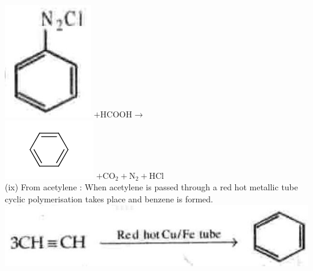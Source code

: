 \documentclass[10pt]{article}
\begin{document}
\includegraphics[max width=\textwidth]{2025_01_28_8470952b98110cec3aabg-205(8)} $+\mathrm{HCOOH} \longrightarrow$\\
\includegraphics{smile-e64fcb047c08d2e0a47b7ef6554e727ec34e89e4} $+\mathrm{CO}_{2}+\mathrm{N}_{2}+\mathrm{HCl}$\\
(ix) From acetylene : When acetylene is passed through a red hot metallic tube cyclic polymerisation takes place and benzene is formed.\\
\includegraphics[max width=\textwidth, center]{2025_01_28_8470952b98110cec3aabg-205}\\
\end{document}

